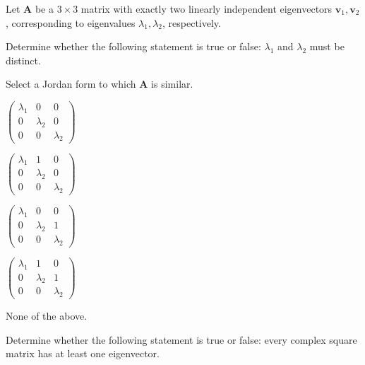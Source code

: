 \begin{problem}
Let $\mathbf A$ be a $3\times3$ matrix with exactly two linearly independent eigenvectors $\mathbf v_1,\mathbf v_2$, corresponding to eigenvalues $\lambda_1,\lambda_2$, respectively.
\begin{problemsubparts}
\item Determine whether the following statement is true or false: $\lambda_1$ and $\lambda_2$ must be distinct.
\item Select a Jordan form to which $\mathbf A$ is similar.
\begin{problemchoices}
\item $\displaystyle\begin{pmatrix}\lambda_1&0&0\\0&\lambda_2&0\\0&0&\lambda_2\end{pmatrix}$
\item $\displaystyle\begin{pmatrix}\lambda_1&1&0\\0&\lambda_2&0\\0&0&\lambda_2\end{pmatrix}$
\item $\displaystyle\begin{pmatrix}\lambda_1&0&0\\0&\lambda_2&1\\0&0&\lambda_2\end{pmatrix}$
\item $\displaystyle\begin{pmatrix}\lambda_1&1&0\\0&\lambda_2&1\\0&0&\lambda_2\end{pmatrix}$
\item None of the above.
\end{problemchoices}
\end{problemsubparts}
\end{problem}

\begin{problem}
Determine whether the following statement is true or false: every complex square matrix has at least one eigenvector.
\end{problem}

